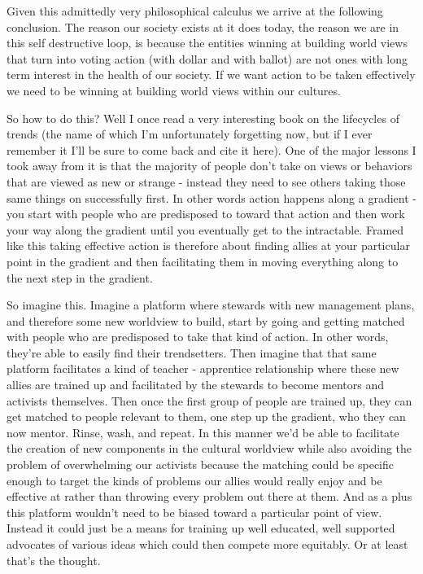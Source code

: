 \documentclass[10pt,a5paper]{book}
\begin{document}
Given this admittedly very philosophical calculus we arrive at the following conclusion. The reason our society exists at it does today, the reason we are in this self destructive loop, is because the entities winning at building world views that turn into voting action (with dollar and with ballot) are not ones with long term interest in the health of our society. If we want action to be taken effectively we need to be winning at building world views within our cultures. 

So how to do this? Well I once read a very interesting book on the lifecycles of trends (the name of which I'm unfortunately forgetting now, but if I ever remember it I'll be sure to come back and cite it here). One of the major lessons I took away from it is that the majority of people don't take on views or behaviors that are viewed as new or strange - instead they need to see others taking those same things on successfully first. In other words action happens along a gradient - you start with people who are predisposed to toward that action and then work your way along the gradient until you eventually get to the intractable. Framed like this taking effective action is therefore about finding allies at your particular point in the gradient and then facilitating them in moving everything along to the next step in the gradient. 

So imagine this. Imagine a platform where stewards with new management plans, and therefore some new worldview to build, start by going and getting matched with people who are predisposed to take that kind of action. In other words, they're able to easily find their trendsetters. Then imagine that that same platform facilitates a kind of teacher - apprentice relationship where these new allies are trained up and facilitated by the stewards to become mentors and activists themselves. Then once the first group of people are trained up, they can get matched to people relevant to them, one step up the gradient, who they can now mentor. Rinse, wash, and repeat. In this manner we'd be able to facilitate the creation of new components in the cultural worldview while also avoiding the problem of overwhelming our activists because the matching could be specific enough to target the kinds of problems our allies would really enjoy and be effective at rather than throwing every problem out there at them. And as a plus this platform wouldn't need to be biased toward a particular point of view. Instead it could just be a means for training up well educated, well supported advocates of various ideas which could then compete more equitably. Or at least that's the thought. 
\end{document}
